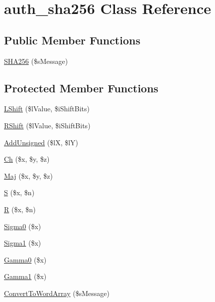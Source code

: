 \hypertarget{classauth__sha256}{\section{auth\-\_\-sha256 Class Reference}
\label{classauth__sha256}
}
\subsection*{Public Member Functions}
\begin{DoxyCompactItemize}
\item 
\hyperlink{classauth__sha256_a31a5a620114fe9436435eac3854bc836}{S\-H\-A256} (\$s\-Message)
\end{DoxyCompactItemize}
\subsection*{Protected Member Functions}
\begin{DoxyCompactItemize}
\item 
\hyperlink{classauth__sha256_a1d366b9a160ce952ae7e3a0e9795a184}{L\-Shift} (\$l\-Value, \$i\-Shift\-Bits)
\item 
\hyperlink{classauth__sha256_a251423e114a652ecd22623d9cacd5e71}{R\-Shift} (\$l\-Value, \$i\-Shift\-Bits)
\item 
\hyperlink{classauth__sha256_ac95c0d52fbb6f6ba6742b46e32603c62}{Add\-Unsigned} (\$l\-X, \$l\-Y)
\item 
\hyperlink{classauth__sha256_ac3d425093bc89e2740ca350fd575b579}{Ch} (\$x, \$y, \$z)
\item 
\hyperlink{classauth__sha256_a9049c35d488d99b319cbf558fb23be2e}{Maj} (\$x, \$y, \$z)
\item 
\hyperlink{classauth__sha256_a7d983ab24acf3fdb494befd08318a7d9}{S} (\$x, \$n)
\item 
\hyperlink{classauth__sha256_a78fac55a7fa827fef394c8676fce098e}{R} (\$x, \$n)
\item 
\hyperlink{classauth__sha256_a00aca1a8683481d7e1add5e8dbd3eb3f}{Sigma0} (\$x)
\item 
\hyperlink{classauth__sha256_a913ed4860d2e35ed11736d2d5adf6219}{Sigma1} (\$x)
\item 
\hyperlink{classauth__sha256_a05d6559aa379f6a2b41097373e06d42f}{Gamma0} (\$x)
\item 
\hyperlink{classauth__sha256_ab3a795e0c8c653875480cf5ba510edbe}{Gamma1} (\$x)
\item 
\hyperlink{classauth__sha256_a71e9010664f0c5083e0248c9ff93f514}{Convert\-To\-Word\-Array} (\$s\-Message)
\end{DoxyCompactItemize}
